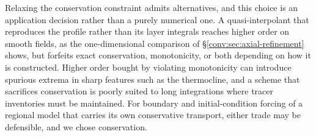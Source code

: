 Relaxing the conservation constraint admits alternatives, and this choice is an application decision rather than a purely numerical one. A quasi-interpolant that reproduces the profile rather than its layer integrals reaches higher order on smooth fields, as the one-dimensional comparison of \S\ref{conv:sec:axial-refinement} shows, but forfeits exact conservation, monotonicity, or both depending on how it is constructed. Higher order bought by violating monotonicity can introduce spurious extrema in sharp features such as the thermocline, and a scheme that sacrifices conservation is poorly suited to long integrations where tracer inventories must be maintained. For boundary and initial-condition forcing of a regional model that carries its own conservative transport, either trade may be defensible, and we chose conservation.
%
%
%


